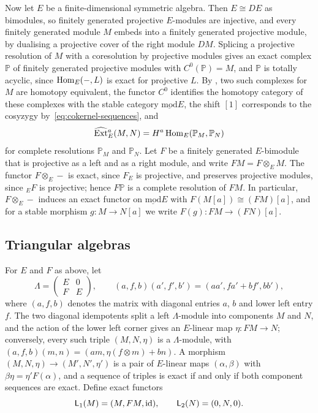 Now let $E$ be a finite-dimensional symmetric algebra. Then
${E\cong DE}$ as bimodules, so finitely generated projective $E$-modules are
injective, and every finitely generated module $M$ embeds into a finitely
generated projective module, by dualising a projective cover of the right
module $DM$. Splicing a projective resolution of $M$ with a coresolution by
projective modules gives an exact complex $\mathbb{P}$ of finitely generated
projective modules with ${C^0(\mathbb{P})=M}$, and $\mathbb{P}$ is totally
acyclic, since $\Hom[E]{-}{L}$ is exact for projective $L$. By
, two such complexes for $M$ are homotopy
equivalent, the functor $C^0$ identifies the homotopy category of these
complexes with the stable category $\operatorname{\underline{mod}}E$, the
shift $[1]$ corresponds to the cosyzygy by~\eqref{eq:cokernel-sequences}, and
\[
  \widehat{\operatorname{Ext}}{}^a_E(M,N)=H^a\Hom[E]{\mathbb{P}_M}
  {\mathbb{P}_N}
\]
for complete resolutions $\mathbb{P}_M$ and $\mathbb{P}_N$. Let $F$ be a
finitely generated $E$-bimodule that is projective as a left and as a right
module, and write ${FM=F\otimes_EM}$. The functor ${F\otimes_E-}$ is exact, since
$F_E$ is projective, and preserves projective modules, since ${}_EF$ is
projective; hence $F\mathbb{P}$ is a complete resolution of $FM$. In particular,
${F\otimes_E-}$ induces an exact functor on
$\operatorname{\underline{mod}}E$ with ${F(M[a])\cong(FM)[a]}$, and for a stable
morphism ${g\colon M\to N[a]}$ we write ${F(g)\colon FM\to(FN)[a]}$.

\subsection{Triangular algebras}
\label{subsec:triangular}

For $E$ and $F$ as above, let
\[
  \Lambda=\begin{pmatrix}E&0\\F&E\end{pmatrix},\qquad
  (a,f,b)(a',f',b')=(aa',fa'+bf',bb'),
\]
where $(a,f,b)$ denotes the matrix with diagonal entries $a$, $b$ and lower
left entry $f$. The two diagonal idempotents split a left $\Lambda$-module
into components $M$ and $N$, and the action of the lower left corner gives an
$E$-linear map ${\eta\colon FM\to N}$; conversely, every such triple
$(M,N,\eta)$ is a $\Lambda$-module, with ${(a,f,b)(m,n)=(am,\eta(f\otimes
m)+bn)}$. A morphism ${(M,N,\eta)\to(M',N',\eta')}$ is a pair of $E$-linear maps
$(\alpha,\beta)$ with ${\beta\eta=\eta'F(\alpha)}$, and a sequence of triples is
exact if and only if both component sequences are exact. Define exact functors
\[
  \mathsf{L}_1(M)=(M,FM,\id),\qquad\mathsf{L}_2(N)=(0,N,0).
\]

